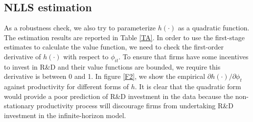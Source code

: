 \documentclass[11pt]{article}
\begin{document}
\subsection{NLLS estimation} \label{appc2}
As a robustness check, we also try to parameterize $h(\cdot)$ as a quadratic function. The estimation results are reported in Table \ref{TA}. In order to use the first-stage estimates to calculate the value function, we need to check the first-order derivative of $h(\cdot)$ with respect to $\phi_{it}$. To ensure that firms have some incentives to invest in R\&D and their value functions are bounded, we require this derivative is between 0 and 1. In figure \ref{F2}, we show the empirical $\partial h(\cdot)/\partial\phi_t$ against productivity for different forms of $h$. It is clear that the quadratic form would provide a poor prediction of R\&D investment in the data because the non-stationary productivity process will discourage firms from undertaking R\&D investment in the infinite-horizon model. 
\end{document}
